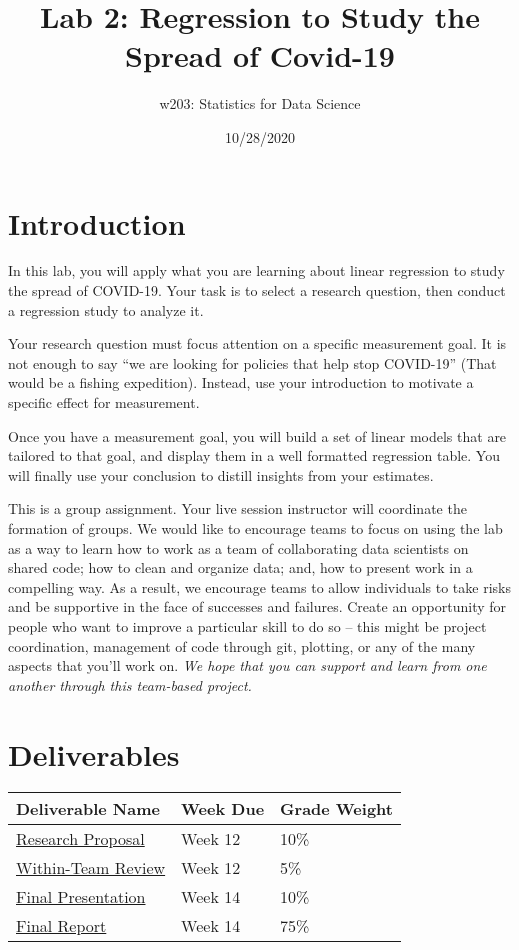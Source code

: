\documentclass[
]{article}
\title{Lab 2: Regression to Study the Spread of Covid-19}
\author{w203: Statistics for Data Science}
\date{10/28/2020}
\begin{document}
\maketitle

\hypertarget{introduction}{%
\section{Introduction}\label{introduction}}

In this lab, you will apply what you are learning about linear
regression to study the spread of COVID-19. Your task is to select a
research question, then conduct a regression study to analyze it.

Your research question must focus attention on a specific measurement
goal. It is not enough to say ``we are looking for policies that help
stop COVID-19'' (That would be a fishing expedition). Instead, use your
introduction to motivate a specific effect for measurement.

Once you have a measurement goal, you will build a set of linear models
that are tailored to that goal, and display them in a well formatted
regression table. You will finally use your conclusion to distill
insights from your estimates.

This is a group assignment. Your live session instructor will coordinate
the formation of groups. We would like to encourage teams to focus on
using the lab as a way to learn how to work as a team of collaborating
data scientists on shared code; how to clean and organize data; and, how
to present work in a compelling way. As a result, we encourage teams to
allow individuals to take risks and be supportive in the face of
successes and failures. Create an opportunity for people who want to
improve a particular skill to do so -- this might be project
coordination, management of code through git, plotting, or any of the
many aspects that you'll work on. \emph{We hope that you can support and
learn from one another through this team-based project.}

\hypertarget{deliverables}{%
\section{Deliverables}\label{deliverables}}

\begin{longtable}[]{@{}lll@{}}
\toprule
Deliverable Name & Week Due & Grade Weight \\
\midrule
\endhead
\protect\hyperlink{research-proposal}{Research Proposal} & Week 12 &
10\% \\
\protect\hyperlink{within-team-review}{Within-Team Review} & Week 12 &
5\% \\
\protect\hyperlink{final-presentation}{Final Presentation} & Week 14 &
10\% \\
\protect\hyperlink{final-report}{Final Report} & Week 14 & 75\% \\
\bottomrule
\end{longtable}
\end{document}
